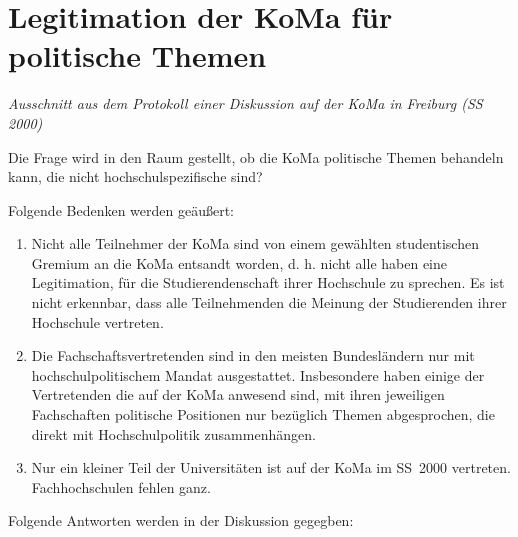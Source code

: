 \chapter{Legitimation der KoMa für politische Themen}

\emph{Ausschnitt aus dem Protokoll einer Diskussion auf der KoMa in Freiburg
(SS 2000)}

Die Frage wird in den Raum gestellt, ob die KoMa politische Themen behandeln
kann, die nicht hochschulspezifische sind?

Folgende Bedenken werden geäußert:
\begin{enumerate}
\item Nicht alle Teilnehmer der KoMa sind von einem gewählten studentischen
	Gremium an die KoMa entsandt worden, d. h.  nicht alle haben eine
	Legitimation, für die Studierendenschaft ihrer Hochschule zu sprechen.  Es
	ist nicht erkennbar, dass alle Teilnehmenden die Meinung der Studierenden
	ihrer Hochschule vertreten.
\item Die Fachschaftsvertretenden sind in den meisten Bundesländern nur mit
	hochschulpolitischem Mandat ausgestattet.  Insbesondere haben einige der
	Vertretenden die auf der KoMa anwesend sind, mit ihren jeweiligen
	Fachschaften politische Positionen nur bezüglich Themen abgesprochen, die
	direkt mit Hochschulpolitik zusammenhängen.
\item Nur ein kleiner Teil der Universitäten ist auf der KoMa im SS~2000
	vertreten. Fachhochschulen fehlen ganz.
\end{enumerate}

Folgende Antworten werden in der Diskussion gegegben:

